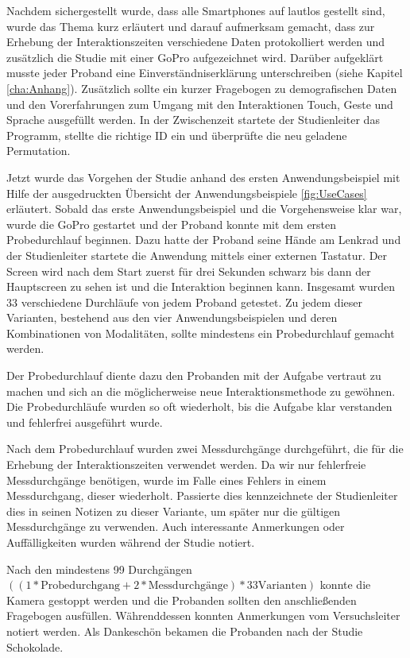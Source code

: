 Nachdem sichergestellt wurde, dass alle Smartphones auf lautlos gestellt sind, wurde das Thema kurz erläutert und darauf aufmerksam gemacht, dass zur Erhebung der Interaktionszeiten verschiedene Daten protokolliert werden und zusätzlich die Studie mit einer GoPro aufgezeichnet wird.
Darüber aufgeklärt musste jeder Proband eine Einverständniserklärung unterschreiben (siehe Kapitel \ref{cha:Anhang}).
Zusätzlich sollte ein kurzer Fragebogen zu demografischen Daten und den Vorerfahrungen zum Umgang mit den Interaktionen Touch, Geste und Sprache ausgefüllt werden.
In der Zwischenzeit startete der Studienleiter das Programm, stellte die richtige ID ein und überprüfte die neu geladene Permutation.

Jetzt wurde das Vorgehen der Studie anhand des ersten Anwendungsbeispiel mit Hilfe der ausgedruckten Übersicht der Anwendungsbeispiele \ref{fig:UseCases} erläutert.
Sobald das erste Anwendungsbeispiel und die Vorgehensweise klar war, wurde die GoPro gestartet und der Proband konnte mit dem ersten Probedurchlauf beginnen. Dazu hatte der Proband seine Hände am Lenkrad und der Studienleiter startete die Anwendung mittels einer externen Tastatur. 
Der Screen wird nach dem Start zuerst für drei Sekunden schwarz bis dann der Hauptscreen zu sehen ist und die Interaktion beginnen kann.
Insgesamt wurden 33 verschiedene Durchläufe von jedem Proband getestet.
Zu jedem dieser Varianten, bestehend aus den vier Anwendungsbeispielen und deren Kombinationen von Modalitäten, sollte mindestens ein Probedurchlauf gemacht werden.

Der Probedurchlauf diente dazu den Probanden mit der Aufgabe vertraut zu machen und sich an die möglicherweise neue Interaktionsmethode zu gewöhnen.
Die Probedurchläufe wurden so oft wiederholt, bis die Aufgabe klar verstanden und fehlerfrei ausgeführt wurde. 

Nach dem Probedurchlauf wurden zwei Messdurchgänge durchgeführt, die für die Erhebung der Interaktionszeiten verwendet werden.
Da wir nur fehlerfreie Messdurchgänge benötigen, wurde im Falle eines Fehlers in einem Messdurchgang, dieser wiederholt.
Passierte dies kennzeichnete der Studienleiter dies in seinen Notizen zu dieser Variante, um später nur die gültigen Messdurchgänge zu verwenden.
Auch interessante Anmerkungen oder Auffälligkeiten wurden während der Studie notiert.

Nach den mindestens 99 Durchgängen $((1 * \text{Probedurchgang} + 2 * \text{Messdurchgänge}) * 33 \text{Varianten})$ konnte die Kamera gestoppt werden und die Probanden sollten den anschließenden Fragebogen ausfüllen.
Währenddessen konnten Anmerkungen vom Versuchsleiter notiert werden. 
Als Dankeschön bekamen die Probanden nach der Studie Schokolade.

